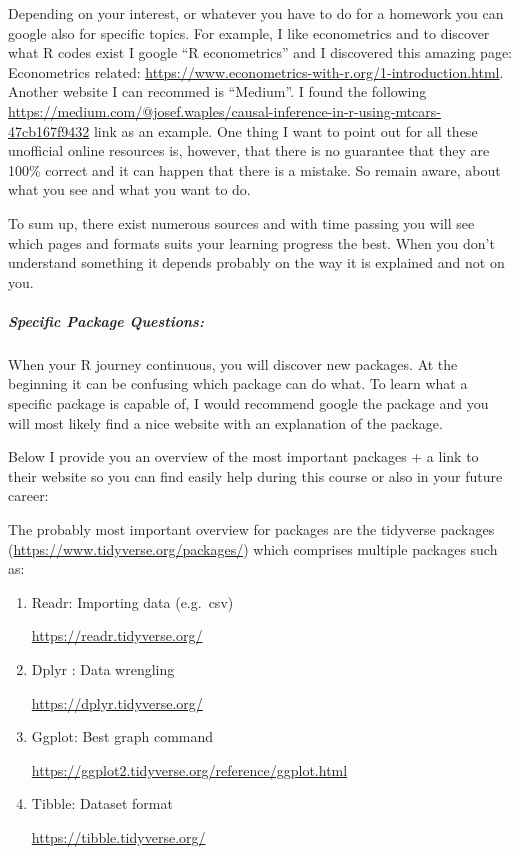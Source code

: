 \documentclass[
]{article}
\begin{document}
Depending on your interest, or whatever you have to do for a homework
you can google also for specific topics. For example, I like
econometrics and to discover what R codes exist I google ``R
econometrics'' and I discovered this amazing page: Econometrics related:
\url{https://www.econometrics-with-r.org/1-introduction.html}. Another
website I can recommed is ``Medium''. I found the following
\url{https://medium.com/@josef.waples/causal-inference-in-r-using-mtcars-47cb167f9432}
link as an example. One thing I want to point out for all these
unofficial online resources is, however, that there is no guarantee that
they are 100\% correct and it can happen that there is a mistake. So
remain aware, about what you see and what you want to do.

To sum up, there exist numerous sources and with time passing you will
see which pages and formats suits your learning progress the best. When
you don't understand something it depends probably on the way it is
explained and not on you.

\hypertarget{specific-package-questions}{%
\subparagraph{Specific Package
Questions:}\label{specific-package-questions}}

When your R journey continuous, you will discover new packages. At the
beginning it can be confusing which package can do what. To learn what a
specific package is capable of, I would recommend google the package and
you will most likely find a nice website with an explanation of the
package.

Below I provide you an overview of the most important packages + a link
to their website so you can find easily help during this course or also
in your future career:

The probably most important overview for packages are the tidyverse
packages (\url{https://www.tidyverse.org/packages/}) which comprises
multiple packages such as:

\begin{enumerate}
\def\labelenumi{\arabic{enumi}.}
\item
  Readr: Importing data (e.g.~csv)

  \url{https://readr.tidyverse.org/}
\item
  Dplyr : Data wrengling

  \url{https://dplyr.tidyverse.org/}
\item
  Ggplot: Best graph command

  \url{https://ggplot2.tidyverse.org/reference/ggplot.html}
\item
  Tibble: Dataset format

  \url{https://tibble.tidyverse.org/}
\end{enumerate}
\end{document}
